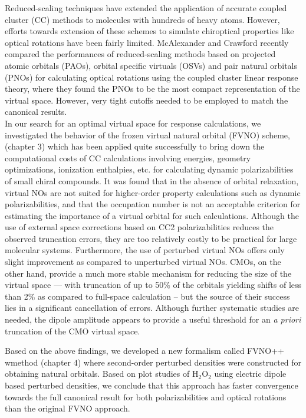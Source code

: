 Reduced-scaling techniques have extended the application of accurate coupled cluster (CC)
methods to molecules with hundreds of heavy atoms\cite{}. However, efforts towards extension 
of these schemes to simulate chiroptical properties like optical rotations have been fairly 
limited\cite{}. McAlexander and Crawford recently compared the performances of
reduced-scaling methods based on projected atomic orbitals (PAOs)\cite{}, orbital specific virtuals (OSVs)\cite{} 
and pair natural orbitals (PNOs)\cite{} for calculating optical rotations\cite{} using the
coupled cluster linear response theory, where they found the PNOs to be the most compact 
representation of the virtual space. However, very tight cutoffs needed to be employed to 
match the canonical results. \\
In our search for an optimal virtual space for response calculations,
we investigated the behavior of the frozen virtual natural orbital (FVNO) scheme,
(chapter 3) which has been applied quite successfully to bring down the 
computational costs of CC calculations involving energies, geometry optimizations, 
ionization enthalpies, etc.\cite{} for calculating dynamic polarizabilities of 
small chiral compounds. It was found that in the absence of orbital relaxation, 
virtual NOs are not suited for higher-order property calculations such as dynamic
polarizabilities, and that the occupation number is not an acceptable
criterion for estimating the importance of a virtual orbital for such
calculations.  Although the use of external space corrections based on CC2
polarizabilities reduces the observed truncation errors, they are too
relatively costly to be practical for large molecular systems.  Furthermore,
the use of perturbed virtual NOs offers only slight improvement as compared to
unperturbed virtual NOs.  CMOs, on the other hand, provide a much more stable
mechanism for reducing the size of the virtual space --- with truncation of up
to 50\% of the orbitals yielding shifts of less than 2\% as compared to
full-space calculation -- but the source of their success lies in a
significant cancellation of errors.  Although further systematic studies are
needed, the dipole amplitude appears to provide a useful threshold for an {\em
a priori} truncation of the CMO virtual space.

Based on the above findings, we developed a new formalism called FVNO++ wmethod
(chapter 4) where second-order perturbed densities were constructed for obtaining
natural orbitals. Based on plot studies of H$_2$O$_2$ using electric dipole based 
perturbed densities, we conclude that this approach has faster convergence towards 
the full canonical result for both polarizabilities and optical rotations 
than the original FVNO approach.


